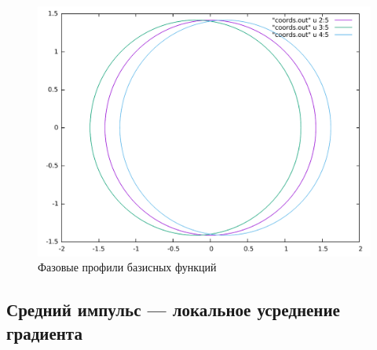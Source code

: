 \documentclass[a4paper,14pt]{extarticle}
\begin{document}
\begin{figure}[H]
\centering
\includegraphics[scale = 0.5]{../all/images/phase_1.pdf}
\caption{Фазовые профили базисных функций}
\end{figure}

\newpage

\subsection{Средний импульс --- локальное усреднение градиента}

\end{document}

